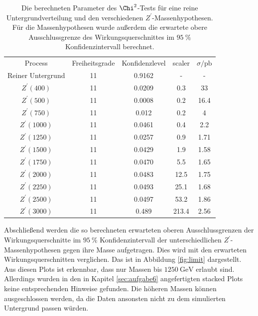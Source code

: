 \begin{table}
  \centering
  \caption{Die berechneten Parameter des $\Chi^2$-Tests für eine reine Untergrundverteilung und den verschiedenen $Z^\prime$-Massenhypothesen. Für die Massenhypothesen wurde außerdem die erwartete obere Ausschlussgrenze des Wirkungsquerschnittes im $\SI{95}{\percent}$ Konfidenzintervall berechnet.}
  \label{tab:chi2}
  \begin{tabular}{c|cccc}
    \toprule
    Process & Freiheitsgrade & Konfidenzlevel & scaler & $\sigma / \si{\pico\barn}$ \\
    Reiner Untergrund & 11 & 0.9162 & - & - \\
    $Z^\prime (400)$  & 11 & 0.0209 & 0.3 & 33 \\
    $Z^\prime (500)$  & 11 & 0.0008 & 0.2 & 16.4 \\
    $Z^\prime (750)$  & 11 & 0.012  & 0.2 & 4 \\
    $Z^\prime (1000)$ & 11 & 0.0461 & 0.4 & 2.2 \\
    $Z^\prime (1250)$ & 11 & 0.0257 & 0.9 & 1.71 \\
    $Z^\prime (1500)$ & 11 & 0.0429 & 1.9 & 1.58 \\
    $Z^\prime (1750)$ & 11 & 0.0470 & 5.5 & 1.65 \\
    $Z^\prime (2000)$ & 11 & 0.0483 & 12.5 & 1.75 \\
    $Z^\prime (2250)$ & 11 & 0.0493 & 25.1 & 1.68 \\
    $Z^\prime (2500)$ & 11 & 0.0497 & 53.2 & 1.86 \\
    $Z^\prime (3000)$ & 11 & 0.489  & 213.4 & 2.56 \\
    \midrule
    \bottomrule
  \end{tabular}
\end{table}

Abschließend werden die so berechneten erwarteten oberen Ausschlussgrenzen der Wirkungsquerschnitte im $\SI{95}{\percent}$ Konfidenzintervall der unterschiedlichen $Z^\prime$-Massenhypothesen gegen ihre Masse aufgetragen.
Dies wird mit den erwarteten Wirkungsquerschnitten verglichen.
Das ist in Abbildung \ref{fig:limit} dargestellt.
Aus diesen Plots ist erkennbar, dass nur Massen bis $\SI{1250}{\giga\electronvolt}$ erlaubt sind.
Allerdings wurden in den in Kapitel \ref{sec:aufgabe6} angefertigten stacked Plots keine entsprechenden Hinweise gefunden.
Die höheren Massen können ausgeschlossen werden, da die Daten ansonsten nicht zu dem simulierten Untergrund passen würden.

